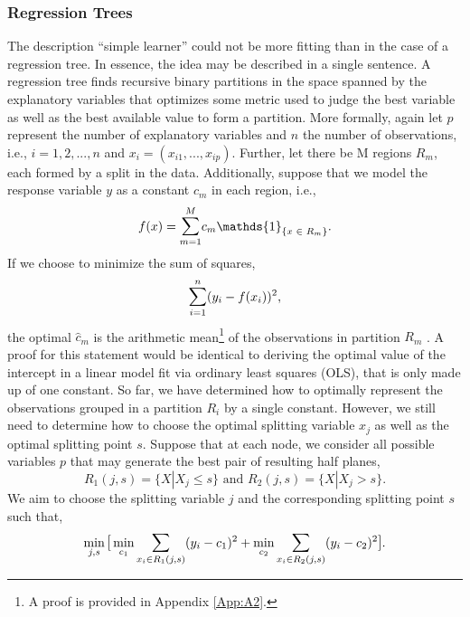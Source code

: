 \documentclass[a4paper,12pt, headsepline]{scrartcl}
\DeclareMathOperator*{\minA}{min}
\numberwithin{equation}{section}
\begin{document}
\subsubsection{Regression Trees}\label{subsubsec:trees}
The description \enquote{simple learner} could not be more fitting than in the case of a regression tree. In essence, the idea may be described in a single sentence. A regression tree finds recursive binary partitions in the space spanned by the explanatory variables that optimizes some metric used to judge the best variable as well as the best available value to form a partition. More formally, again let $p$ represent the number of explanatory variables and $n$ the number of observations, i.e., $i = 1, 2, ..., n$ and $x_i = (x_{i1}, ..., x_{ip})$. Further, let there be M regions $R_m$, each formed by a split in the data. Additionally, suppose that we model the response variable $y$ as a constant $c_m$ in each region, i.e.,
\[
f(x) = \mathlarger{\sum}\limits_{m = 1}^{M} c_m \mathds{1}_{\{x \text{ } \in \text{ } R_m\}}.
\]
If we choose to minimize the sum of squares, 
\[
\mathlarger{\sum}\limits_{i = 1}^{n}(y_i - f(x_i))^2,
\]
the optimal $\hat c_m$ is the arithmetic mean\footnote{A proof is provided in Appendix \ref{App:A2}.} of the observations in partition $R_m$ \citep{hastie09}. A proof for this statement would be identical to deriving the optimal value of the intercept in a linear model fit via ordinary least squares (OLS), that is only made up of one constant. So far, we have determined how to optimally represent the observations grouped in a partition $R_i$ by a single constant. However, we still need to determine how to choose the optimal splitting variable $x_j$ as well as the optimal splitting point $s$. Suppose that at each node, we consider all possible variables $p$ that may generate the best pair of resulting half planes,
\[
R_1(j, s) = \{X|X_j \leq s\} \text{ and } R_2(j, s) = \{X|X_j > s\}.
\]
We aim to choose the splitting variable $j$ and the corresponding splitting point $s$ such that,
\[
\minA_{j, s}\mathlarger{[} \minA_{c_1} \mathlarger{\sum}\limits_{x_i \in R_1(j, s)} (y_i - c_1)^2 + \minA_{c_2} \mathlarger{\sum}\limits_{x_i \in R_2(j, s)} (y_i - c_2)^2 \mathlarger{]}.
\]
\end{document}
